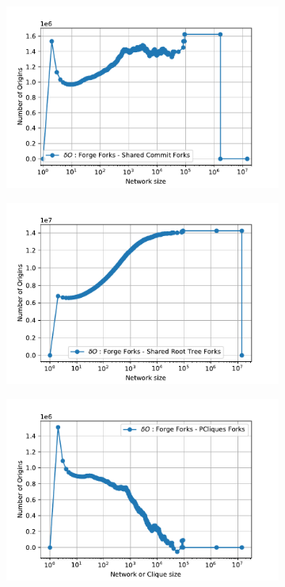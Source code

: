 \begin{figure}
    \centering
    \begin{subfigure}{.45\textwidth}
    \includegraphics[width=\linewidth]{img/forks/gr/Diff_WCCDF_gh-swhrev.pdf}
    \end{subfigure}
    \begin{subfigure}{.45\textwidth}
    \includegraphics[width=\linewidth]{img/forks/gr/Diff_WCCDF_gh-swhrootdir.pdf}
    \end{subfigure}
    \newline
    \begin{subfigure}{.45\textwidth}
    \includegraphics[width=\linewidth]{img/forks/gr/Diff_WCCDF_gh-pcliques.pdf}

\end{subfigure}
\end{figure}
